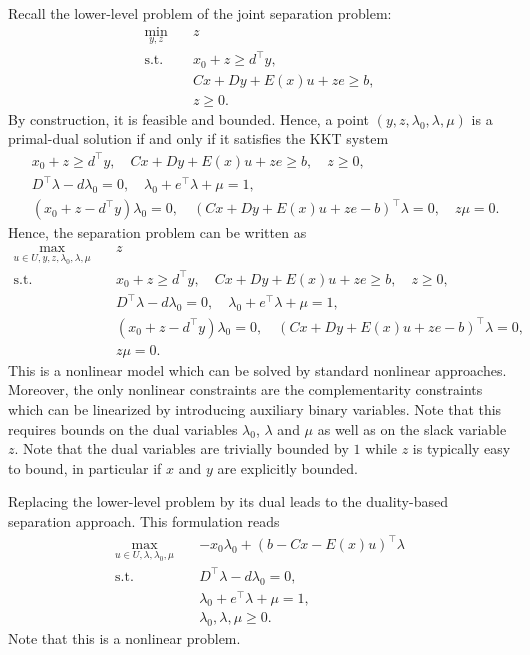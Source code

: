 Recall the lower-level problem of the joint separation problem:
%
\begin{subequations}
    \begin{align}
        \min_{y,z} \quad & z \\
        \text{s.t.} \quad & x_0 + z \ge d^\top y, \\
        & Cx + Dy + E(x)u + ze \ge b, \\
        & z \ge 0.
    \end{align}
\end{subequations}
By construction, it is feasible and bounded. Hence, a point
$(y,z,\lambda_0,\lambda,\mu)$ is a primal-dual solution if and only if it
satisfies the KKT system 
\begin{align*}
    & x_0 + z \ge d^\top y, \quad Cx + Dy + E(x)u + ze \ge b, \quad z \ge 0, \\
    & D^\top\lambda - d \lambda_0 = 0, \quad \lambda_0 + e^\top\lambda + \mu = 1, \\
    & (x_0 + z - d^\top y)\lambda_0 = 0, \quad 
    (Cx + Dy + E(x)u + ze - b)^\top \lambda = 0, \quad 
    z\mu = 0.
\end{align*}
Hence, the separation problem can be written as 
\begin{align*}
    \max_{u\in U, y,z,\lambda_0,\lambda,\mu} \quad & z \\
    \text{s.t.} \quad & x_0 + z \ge d^\top y, \quad Cx + Dy + E(x)u + ze \ge b, \quad z \ge 0, \\
    & D^\top\lambda - d \lambda_0 = 0, \quad \lambda_0 + e^\top\lambda + \mu = 1, \\
    & (x_0 + z - d^\top y)\lambda_0 = 0, \quad 
    (Cx + Dy + E(x)u + ze - b)^\top \lambda = 0, \\
    & z\mu = 0.
\end{align*}
%
This is a nonlinear model which can be solved by standard nonlinear
approaches. Moreover, the only nonlinear constraints are the complementarity
constraints which can be linearized by introducing auxiliary binary variables.
Note that this requires bounds on the dual variables $\lambda_0$, $\lambda$
and $\mu$ as well as on the slack variable $z$. Note that the dual variables
are trivially bounded by $1$ while $z$ is typically easy to bound, in
particular if $x$ and $y$ are explicitly bounded. 


Replacing the lower-level problem by its dual leads to the duality-based
separation approach. This formulation reads 
\begin{align*}
    \max_{u\in U,\lambda,\lambda_0,\mu} \quad & -x_0\lambda_0 + (b - Cx - E(x)u)^\top \lambda \\
    \text{s.t.} \quad & D^\top\lambda - d\lambda_0 = 0, \\
    & \lambda_0 + e^\top\lambda + \mu = 1, \\
    & \lambda_0, \lambda, \mu \ge 0.
\end{align*}
Note that this is a nonlinear problem. 


